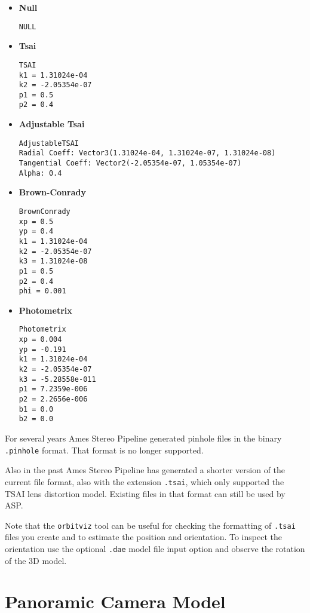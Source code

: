 \begin{itemize}{}
\item  \textbf{Null}
\begin{verbatim}
NULL
\end{verbatim}

\item  \textbf{Tsai}
\begin{verbatim}
TSAI
k1 = 1.31024e-04
k2 = -2.05354e-07
p1 = 0.5
p2 = 0.4
\end{verbatim}

\item  \textbf{Adjustable Tsai}
\begin{verbatim}
AdjustableTSAI
Radial Coeff: Vector3(1.31024e-04, 1.31024e-07, 1.31024e-08)
Tangential Coeff: Vector2(-2.05354e-07, 1.05354e-07)
Alpha: 0.4
\end{verbatim}

\item  \textbf{Brown-Conrady}
\begin{verbatim}
BrownConrady
xp = 0.5
yp = 0.4
k1 = 1.31024e-04
k2 = -2.05354e-07
k3 = 1.31024e-08
p1 = 0.5
p2 = 0.4
phi = 0.001
\end{verbatim}

\item  \textbf{Photometrix}
\begin{verbatim}
Photometrix
xp = 0.004
yp = -0.191
k1 = 1.31024e-04
k2 = -2.05354e-07
k3 = -5.28558e-011
p1 = 7.2359e-006
p2 = 2.2656e-006
b1 = 0.0
b2 = 0.0
\end{verbatim}

\end{itemize}{}

For several years Ames Stereo Pipeline generated pinhole files in the binary \texttt{.pinhole} format.
That format is no longer supported.

Also in the past Ames Stereo Pipeline has generated a shorter version of the current file
format, also with the extension \texttt{.tsai}, which only supported the TSAI lens distortion model.
Existing files in that format can still be used by ASP.

Note that the \texttt{orbitviz} tool can be useful for checking the formatting of \texttt{.tsai}
files you create and to estimate the position and orientation. To inspect the orientation use 
the optional \texttt{.dae} model file input option and observe the rotation of the 3D model.

\section{Panoramic Camera Model}
\label{panoramic}

